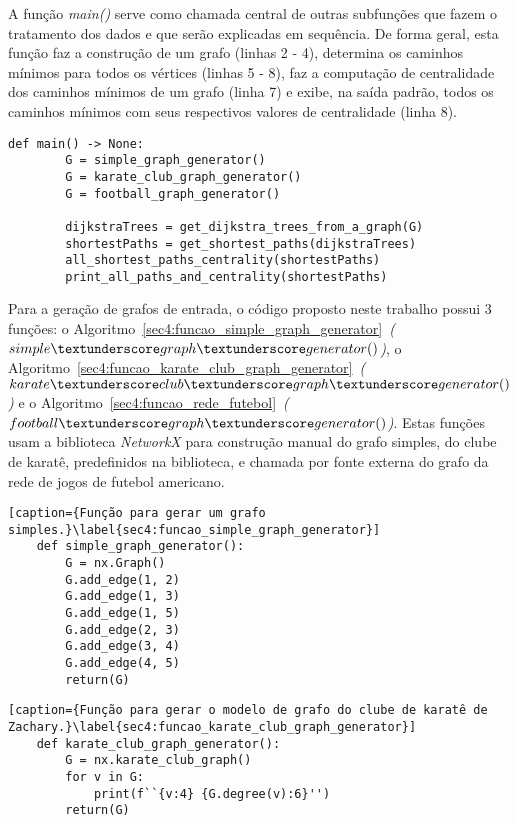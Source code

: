 A função \emph{main()} serve como chamada central de outras subfunções que fazem o tratamento dos dados e que serão explicadas em sequência. De forma geral, esta função faz a construção de um grafo (linhas 2 - 4), determina os caminhos mínimos para todos os vértices (linhas 5 - 8), faz a computação de centralidade dos caminhos mínimos de um grafo (linha 7) e exibe, na saída padrão, todos os caminhos mínimos com seus respectivos valores de centralidade (linha 8).

\begin{lstlisting}[caption={Função central para chamada de subfunções.}]
	def main() -> None:
		G = simple_graph_generator()
		G = karate_club_graph_generator()
		G = football_graph_generator()

		dijkstraTrees = get_dijkstra_trees_from_a_graph(G)
		shortestPaths = get_shortest_paths(dijkstraTrees)
		all_shortest_paths_centrality(shortestPaths)
		print_all_paths_and_centrality(shortestPaths)
\end{lstlisting}

Para a geração de grafos de entrada, o código proposto neste trabalho possui 3 funções: o Algoritmo~\ref{sec4:funcao_simple_graph_generator}~\emph{($simple\textunderscore graph\textunderscore generator()$)}, o Algoritmo~\ref{sec4:funcao_karate_club_graph_generator}~\emph{($karate\textunderscore club\textunderscore graph\textunderscore generator()$)} e o Algoritmo~\ref{sec4:funcao_rede_futebol}~\emph{($football\textunderscore graph\textunderscore generator()$)}. Estas funções usam a biblioteca \emph{NetworkX} para construção manual do grafo simples, do clube de karatê, predefinidos na biblioteca, e chamada por fonte externa do grafo da rede de jogos de futebol americano.

\begin{lstlisting}[caption={Função para gerar um grafo simples.}\label{sec4:funcao_simple_graph_generator}]
	def simple_graph_generator():
		G = nx.Graph()
		G.add_edge(1, 2)
		G.add_edge(1, 3)
		G.add_edge(1, 5)
		G.add_edge(2, 3)
		G.add_edge(3, 4)
		G.add_edge(4, 5)
		return(G)
\end{lstlisting}

\begin{lstlisting}[caption={Função para gerar o modelo de grafo do clube de karatê de Zachary.}\label{sec4:funcao_karate_club_graph_generator}]
	def karate_club_graph_generator():
		G = nx.karate_club_graph()
		for v in G:
			print(f``{v:4} {G.degree(v):6}'')
		return(G)
\end{lstlisting}

